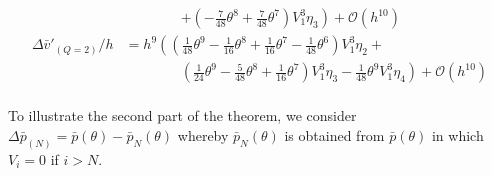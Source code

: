 \begin{align*}
                              & \qquad\qquad \left. + \left(-\frac{7}{48} \theta^{8} + \frac{7}{48} \theta^{7}\right) V_{1}^{3} \eta_{3}\right) + \mathcal{O}(h^{10})                                                                                                    \\
    \Delta \bar{v}'_{(Q=2)}/h & = h^{9}\left(\left(\frac{1}{48} \theta^{9} - \frac{1}{16} \theta^{8} + \frac{1}{16} \theta^{7} - \frac{1}{48} \theta^{6}\right) V_{1}^{3} \eta_{2} + \right.                                                                             \\
                              & \qquad\qquad \left. \left(\frac{1}{24} \theta^{9} - \frac{5}{48} \theta^{8} + \frac{1}{16} \theta^{7}\right) V_{1}^{3} \eta_{3} -\frac{1}{48} \theta^{9} V_{1}^{3} \eta_{4}\right) + \mathcal{O}(h^{10})                                 \\
\end{align*}

To illustrate the second part of the theorem, we consider $\Delta \bar{p}_{(N)} = \bar{p}(\theta) - \bar{p}_N(\theta)$  whereby $\bar{p}_N(\theta)$ is obtained from
$\bar{p}(\theta)$ in which $V_i = 0$ if $i > N$.

